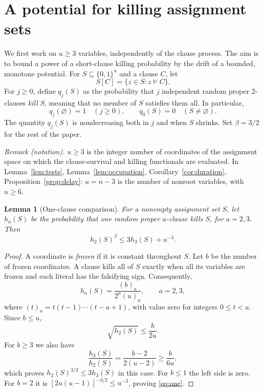 \documentclass[11pt]{article}
\newtheorem{lemma}[theorem]{Lemma}
\theoremstyle{remark}
\numberwithin{equation}{section}
\begin{document}
\section{A potential for killing assignment sets}
\label{sec:potential}

We first work on $u\ge3$ variables, independently of the clause process.
The aim is to bound a power of a short-clause killing probability by
the drift of a bounded, monotone potential.
For $S\subseteq\{0,1\}^u$ and a clause $C$, let
\[
 S[C]=\{z\in S:z\models C\}.
\]
For $j\ge0$, define $q_j(S)$ as the probability that $j$ independent
random proper 2-clauses \emph{kill} $S$, meaning that no member of $S$
satisfies them all. In particular,
\[
 q_j(\varnothing)=1\quad(j\ge0),\qquad
 q_0(S)=0\quad(S\ne\varnothing).
\]
The quantity $q_j(S)$ is nondecreasing both in $j$ and when $S$ shrinks.
Set $\beta=3/2$ for the rest of the paper.

\noindent\textit{Remark (notation).} $u\ge3$ is the integer number of coordinates of the assignment space on which the clause-survival and killing functionals are evaluated. In Lemma~\ref{lem:tests}, Lemma~\ref{lem:occupation}, Corollary~\ref{cor:duration}, Proposition~\ref{prop:delay}: $u=n-3$ is the number of nonroot variables, with $n\ge6$.


\begin{lemma}[One-clause comparison]
\label{lem:one}
For a nonempty assignment set $S$, let $h_a(S)$ be the probability
that one random proper $a$-clause kills $S$, for $a=2,3$. Then
\begin{equation}
 h_2(S)^\beta\le3h_3(S)+u^{-3}.
 \label{eq:one}
\end{equation}
\end{lemma}

\begin{proof}
A coordinate is \emph{frozen} if it is constant throughout $S$.
Let $b$ be the number of frozen coordinates. A clause kills all of $S$
exactly when all its variables are frozen and each literal has the
falsifying sign. Consequently,
\[
 h_a(S)=\frac{(b)_a}{2^a(u)_a},\qquad a=2,3,
\]
where $(t)_a=t(t-1)\cdots(t-a+1)$, with value zero for integers
$0\le t<a$. Since $b\le u$,
\[
 \sqrt{h_2(S)}\le\frac b{2u}.
\]
For $b\ge3$ we also have
\[
 \frac{h_3(S)}{h_2(S)}=\frac{b-2}{2(u-2)}\ge\frac b{6u},
\]
which proves $h_2(S)^{3/2}\le3h_3(S)$ in this case.
For $b\le1$ the left side is zero. For $b=2$ it is
$[2u(u-1)]^{-3/2}\le u^{-3}$, proving \eqref{eq:one}.
\end{proof}
\end{document}
